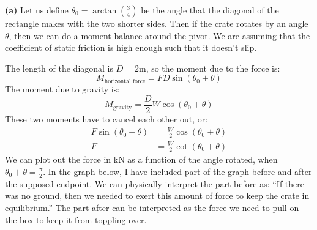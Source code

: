 \documentclass{article}
\begin{document}
\textbf{(a)} Let us define $\theta_0=\arctan\left(\frac{3}{4}\right)$ be the angle that the diagonal of the rectangle makes with the two shorter sides. Then if the crate rotates by an angle $\theta$, then we can do a moment balance around the pivot. We are assuming that the coefficient of static friction is high enough such that it doesn't slip.
\begin{center}
\end{center}
The length of the diagonal is $D=2\si{\meter}$, so the moment due to the force is:
\begin{equation}
    M_\text{horizontal force} = FD\sin(\theta_0+\theta)
    \label{eq:}
\end{equation}
The moment due to gravity is:
\begin{equation}
    M_\text{gravity} = \frac{D}{2}W\cos(\theta_0+\theta)
    \label{eq:}
\end{equation}
These two moments have to cancel each other out, or:
\begin{align}
    F\sin(\theta_0+\theta) &= \frac{W}{2}\cos(\theta_0+\theta) \\ 
    F &= \frac{W}{2}\cot(\theta_0+\theta)
    \label{eq:}
\end{align}
We can plot out the force in kN as a function of the angle rotated, when $\theta_0+\theta=\frac{\pi}{2}$. In the graph below, I have included part of the graph before and after the supposed endpoint. We can physically interpret the part before as: ``If there was no ground, then we needed to exert this amount of force to keep the crate in equilibrium.'' The part after can be interpreted as the force we need to pull on the box to keep it from toppling over.
\begin{center}
\end{center}
\end{document}
